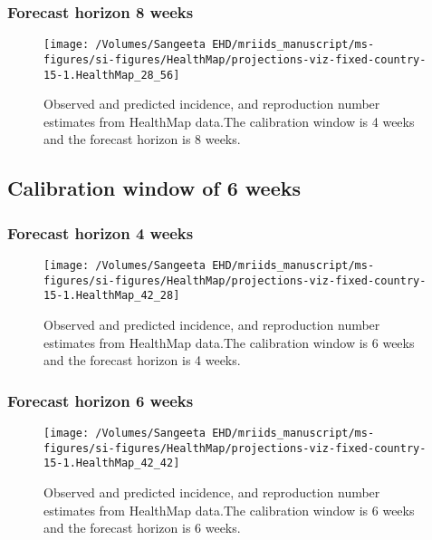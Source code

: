 \documentclass[9pt,twoside,lineno]{pnas-new}
\begin{document}
\hypertarget{forecast-horizon-8-weeks-4}{%
  \subsubsection{Forecast horizon 8 weeks}\label{forecast-horizon-8-weeks-4}}

\begin{figure}

  {\centering \texttt{[image: /Volumes/Sangeeta EHD/mriids\_manuscript/ms-figures/si-figures/HealthMap/projections-viz-fixed-country-15-1.HealthMap\_28\_56]} 

  }

  \caption{Observed and predicted incidence, and reproduction number
    estimates from HealthMap data.The calibration window is 4 weeks
    and the forecast horizon is 8 weeks.}
  \label{fig:hm48}
\end{figure}

\hypertarget{calibration-window-of-6-weeks-1}{%
  \subsection{Calibration window of 6 weeks}\label{calibration-window-of-6-weeks-1}}

\hypertarget{forecast-horizon-4-weeks-4}{%
  \subsubsection{Forecast horizon 4
    weeks}\label{forecast-horizon-4-weeks-4}}

\begin{figure}

  {\centering \texttt{[image: /Volumes/Sangeeta EHD/mriids\_manuscript/ms-figures/si-figures/HealthMap/projections-viz-fixed-country-15-1.HealthMap\_42\_28]} 

  }

  \caption{Observed and predicted incidence, and reproduction number
    estimates from HealthMap data.The calibration window is 6 weeks
    and the forecast horizon is 4 weeks.}
  \label{fig:hm64}
\end{figure}

\hypertarget{forecast-horizon-6-weeks-5}{%
  \subsubsection{Forecast horizon 6 weeks}\label{forecast-horizon-6-weeks-5}}

\begin{figure}

  {\centering \texttt{[image: /Volumes/Sangeeta EHD/mriids\_manuscript/ms-figures/si-figures/HealthMap/projections-viz-fixed-country-15-1.HealthMap\_42\_42]} 

  }

  \caption{Observed and predicted incidence, and
    reproduction number estimates from HealthMap data.The calibration
    window is 6 weeks and the forecast horizon is 6 weeks.}
  \label{fig:hm66}
\end{figure}
\end{document}
